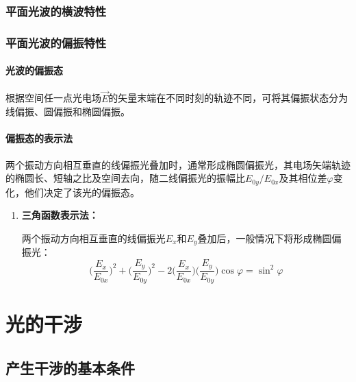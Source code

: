 \documentclass[cn,10pt,chinesefont=founder,math=mtpro2,cite=super,toc=onecol,twoside,openany]{elegantbook}
\begin{document}
\subsection{平面光波的横波特性}
\subsection{平面光波的偏振特性}
\subsubsection{光波的偏振态}
根据空间任一点光电场$\vec E$的矢量末端在不同时刻的轨迹不同，可将其偏振状态分为线偏振、圆偏振和椭圆偏振。
\subsubsection{偏振态的表示法}
两个振动方向相互垂直的线偏振光叠加时，通常形成椭圆偏振光，其电场矢端轨迹的椭圆长、短轴之比及空间去向，随二线偏振光的振幅比$E_{0y}/E_{0x}$及其相位差$\varphi$变化，他们决定了该光的偏振态。
\begin{enumerate}
	\item \textbf{三角函数表示法：}
	
	两个振动方向相互垂直的线偏振光$E_x$和$E_y$叠加后，一般情况下将形成椭圆偏振光：
	\begin{equation}
	\bigg(\frac{E_x}{E_{0x}}\bigg)^2+\bigg(\frac{E_y}{E_{0y}}\bigg)^2-2\bigg(\frac{E_x}{E_{0x}}\bigg)\bigg(\frac{E_y}{E_{0y}}\bigg)\cos\varphi=\sin^2\varphi
	\end{equation}
\end{enumerate}

\chapter{光的干涉}
\section{产生干涉的基本条件}
\end{document}
